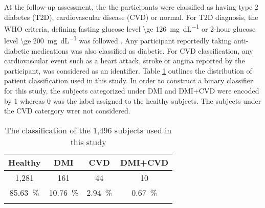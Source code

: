 \documentclass[journal,comsoc]{IEEEtran}
\begin{document}
At the follow-up assessment, the the participants were classified as having type 2 diabetes (T2D), cardiovascular disease (CVD) or normal. For T2D diagnosis, the WHO criteria, defining fasting glucose level \SI[round-mode = off,group-separator = {,}]{\ge 126}{\milli\gram\per\deci\liter} or 2-hour glucose level \SI[round-mode = off,group-separator = {,}]{\ge 200}{\milli\gram\per\deci\liter} was followed \cite{wei_effects_1998}. Any participant reportedly taking anti-diabetic medications was also classified as diabetic. For CVD classification, any cardiovascular event such as a heart attack, stroke or angina reported by the participant, was considered as an identifier. Table \ref{tab:patients} outlines the distribution of patient classification used in this study. In order to construct a binary classifier for this study, the subjects categorized under DMI and DMI+CVD were encoded by 1 whereas 0 was the label assigned to the healthy subjects. The subjects under the CVD catergory wrer not considered.
%
\begin{table}[!h]
\centering
\begin{tabular}{c c c c}
\toprule
Healthy &  DMI & CVD & DMI+CVD\\
\midrule \midrule
1,281 & 161 & 44 & 10\\
\SI{85.63}{\percent} & \SI{10.76}{\percent} & \SI[round-precision=3]{2.94}{\percent} & \SI[round-precision=2]{0.67}{\percent} \\
\bottomrule \\
\end{tabular}
\caption{The classification of the 1,496 subjects used in this study}
\label{tab:patients}
\end{table}

\end{document}
